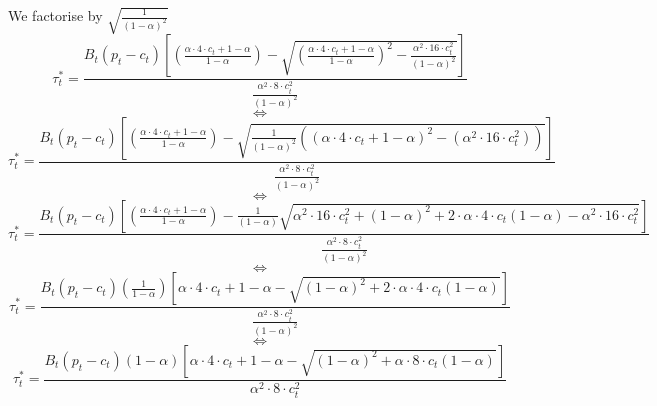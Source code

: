 \documentclass{article}
\begin{document}
We factorise by $\sqrt{\frac{1}{(1-\alpha)^{2}}}$
\begin{equation*}
    \tau_{t}^{*}=\frac{B_{t}\left(p_{t}-c_{t}\right)\left[\left(\frac{\alpha \cdot 4\cdot c_{t}+1-\alpha}{1-\alpha}\right)-\sqrt{\left(\frac{\alpha \cdot 4\cdot c_{t}+1-\alpha}{1-\alpha}\right)^2-\frac{\alpha^{2} \cdot 16\cdot c_{t}^{2}}{(1-\alpha)^{2}}}\right]}{\frac{\alpha^{2} \cdot 8\cdot c_{t}^{2}}{(1-\alpha)^{2}}}
\end{equation*}
$$\iff$$
\begin{equation*}
    \tau_{t}^{*}=\frac{B_{t}\left(p_{t}-c_{t}\right)\left[\left(\frac{\alpha \cdot 4\cdot c_{t}+1-\alpha}{1-\alpha}\right)-\sqrt{\frac{1}{(1-\alpha)^{2}}\left(\left(\alpha \cdot 4\cdot c_{t}+1-\alpha\right)^2-\left(\alpha^{2} \cdot 16\cdot c_{t}^{2}\right)\right)}\right]} {\frac{\alpha^{2} \cdot 8\cdot c_{t}^{2}}{(1-\alpha)^{2}}}
\end{equation*}
$$\iff$$
\begin{equation*}
    \tau_{t}^{*}=\frac{B_{t}\left(p_{t}-c_{t}\right)\left[\left(\frac{\alpha \cdot 4\cdot c_{t}+1-\alpha}{1-\alpha}\right)-\frac{1}{(1-\alpha)}\sqrt{\alpha^{2} \cdot 16\cdot c_{t}^{2}+(1-\alpha)^{2}+2\cdot \alpha\cdot4\cdot c_{t}(1-\alpha)-\alpha^{2} \cdot 16\cdot c_{t}^{2}}\right]} {\frac{\alpha^{2} \cdot 8\cdot c_{t}^{2}}{(1-\alpha)^{2}}}
\end{equation*}
$$\iff$$
\begin{equation*}
    \tau_{t}^{*}=\frac{B_{t}\left(p_{t}-c_{t}\right)(\frac{1}{1-\alpha})\left[{\alpha \cdot 4\cdot c_{t}+1-\alpha}-\sqrt{(1-\alpha)^{2}+2\cdot \alpha\cdot4\cdot c_{t}(1-\alpha)}\right]} {\frac{\alpha^{2} \cdot 8\cdot c_{t}^{2}}{(1-\alpha)^{2}}}
\end{equation*}
$$\iff$$
\begin{equation*}\tag{10}
    \tau_{t}^{*}=\frac{B_{t}\left(p_{t}-c_{t}\right)(1-\alpha)\left[{\alpha \cdot 4\cdot c_{t}+1-\alpha}-\sqrt{(1-\alpha)^{2}+\alpha\cdot8\cdot c_{t}(1-\alpha)}\right]} {\alpha^{2} \cdot 8\cdot c_{t}^{2}}
\end{equation*}


 
\nocite{*}
\end{document}
